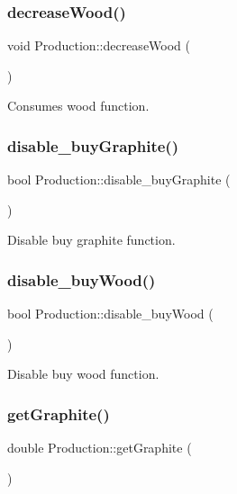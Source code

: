 \subsubsection{\texorpdfstring{decrease\+Wood()}{decreaseWood()}}
{\footnotesize\ttfamily void Production\+::decrease\+Wood (\begin{DoxyParamCaption}{ }\end{DoxyParamCaption})}

Consumes wood function. \mbox{\label{classProduction_a4c87c63f0fdc741f9185dcda6793463e}} 
\subsubsection{\texorpdfstring{disable\+\_\+buy\+Graphite()}{disable\_buyGraphite()}}
{\footnotesize\ttfamily bool Production\+::disable\+\_\+buy\+Graphite (\begin{DoxyParamCaption}{ }\end{DoxyParamCaption})}

Disable buy graphite function. \mbox{\label{classProduction_a5f5c38b7f3f7b23f9029d562c7e53025}} 
\subsubsection{\texorpdfstring{disable\+\_\+buy\+Wood()}{disable\_buyWood()}}
{\footnotesize\ttfamily bool Production\+::disable\+\_\+buy\+Wood (\begin{DoxyParamCaption}{ }\end{DoxyParamCaption})}

Disable buy wood function. \mbox{\label{classProduction_ad8e6b675848c58fcf04e214e383a87fd}} 
\subsubsection{\texorpdfstring{get\+Graphite()}{getGraphite()}}
{\footnotesize\ttfamily double Production\+::get\+Graphite (\begin{DoxyParamCaption}{ }\end{DoxyParamCaption})}

